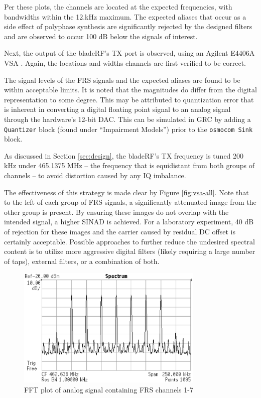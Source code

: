 Per these plots, the channels are located at the expected frequencies, with
bandwidths within the 12.kHz maximum. The expected aliases that occur as a side
effect of polyphase synthesis \cite{TRONDEAU_PFB} are significantly rejected by
the designed filters and are observed to occur 100 dB below the signals of
interest.

Next, the output of the bladeRF's \ac{TX} port is observed, using an
Agilent E4406A \ac{VSA} \cite{VSA}. Again, the locations and widths channels
are first verified to be correct.

The signal levels of the \ac{FRS} signals and the expected aliases are found to
be within acceptable limits. It is noted that the magnitudes do differ from the
digital representation to some degree. This may be attributed to quantization
error that is inherent in converting a digital floating point signal to an
analog signal through the hardware's 12-bit \ac{DAC}. This can be simulated in
\ac{GRC} by adding a \texttt{Quantizer} block (found under ``Impairment
Models'') prior to the \texttt{osmocom Sink} block.

As discussed in Section \ref{sec:design}, the bladeRF's \ac{TX} frequency
is tuned 200 kHz under 465.1375 MHz -- the frequency that is equidistant from both
groups of channels -- to avoid distortion caused by any IQ imbalance.

The effectiveness of this strategy is made clear by Figure \ref{fig:vsa-all}.
Note that to the left of each group of \ac{FRS} signals, a significantly
attenuated image from the other group is present. By ensuring these images
do not overlap with the intended signal, a higher \ac{SINAD} is achieved.
For a laboratory experiment, 40 dB of rejection for these images and the 
carrier caused by residual DC offset is certainly acceptable. Possible
approaches to further reduce the undesired spectral content is to utilize
more aggressive digital filters (likely requiring a large number of taps),
external filters, or a combination of both.

\begin{figure}[h]
  \centering
  \includegraphics[width=3.5in]{images/frs/results/ch1-7.eps}
  \caption{FFT plot of analog signal containing FRS channels 1-7}
  \label{fig:vsa-ch1-7}
\end{figure}


